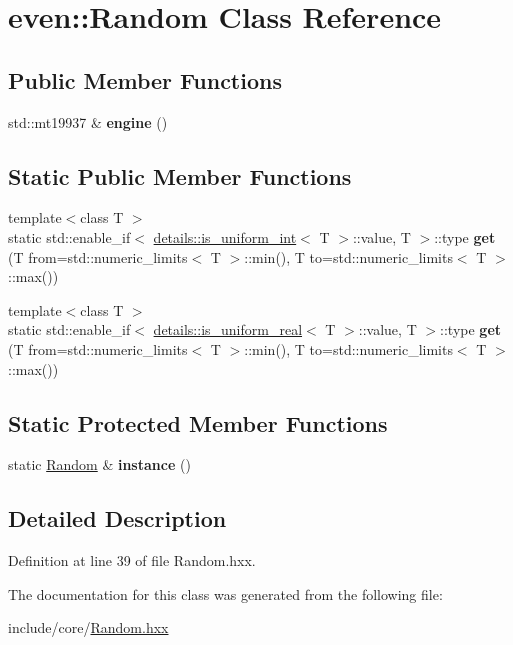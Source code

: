 \hypertarget{classeven_1_1_random}{}\section{even\+:\+:Random Class Reference}
\label{classeven_1_1_random}
\subsection*{Public Member Functions}
\begin{DoxyCompactItemize}
\item 
\mbox{\label{classeven_1_1_random_ae4195d2915ca41c4545f09ccc0d6e423}} 
std\+::mt19937 \& {\bfseries engine} ()
\end{DoxyCompactItemize}
\subsection*{Static Public Member Functions}
\begin{DoxyCompactItemize}
\item 
\mbox{\label{classeven_1_1_random_a4c734dd7bfaa7a349a7fd206b5efcf6b}} 
{\footnotesize template$<$class T $>$ }\\static std\+::enable\+\_\+if$<$ \mbox{\hyperlink{structeven_1_1details_1_1is__uniform__int}{details\+::is\+\_\+uniform\+\_\+int}}$<$ T $>$\+::value, T $>$\+::type {\bfseries get} (T from=std\+::numeric\+\_\+limits$<$ T $>$\+::min(), T to=std\+::numeric\+\_\+limits$<$ T $>$\+::max())
\item 
\mbox{\label{classeven_1_1_random_a85fa66004bad05ddd31dc739bc1b06fc}} 
{\footnotesize template$<$class T $>$ }\\static std\+::enable\+\_\+if$<$ \mbox{\hyperlink{structeven_1_1details_1_1is__uniform__real}{details\+::is\+\_\+uniform\+\_\+real}}$<$ T $>$\+::value, T $>$\+::type {\bfseries get} (T from=std\+::numeric\+\_\+limits$<$ T $>$\+::min(), T to=std\+::numeric\+\_\+limits$<$ T $>$\+::max())
\end{DoxyCompactItemize}
\subsection*{Static Protected Member Functions}
\begin{DoxyCompactItemize}
\item 
\mbox{\label{classeven_1_1_random_a4297ce464776ebbbf4cf91b3c4040aea}} 
static \mbox{\hyperlink{classeven_1_1_random}{Random}} \& {\bfseries instance} ()
\end{DoxyCompactItemize}


\subsection{Detailed Description}


Definition at line 39 of file Random.\+hxx.



The documentation for this class was generated from the following file\+:\begin{DoxyCompactItemize}
\item 
include/core/\mbox{\hyperlink{_random_8hxx}{Random.\+hxx}}\end{DoxyCompactItemize}
